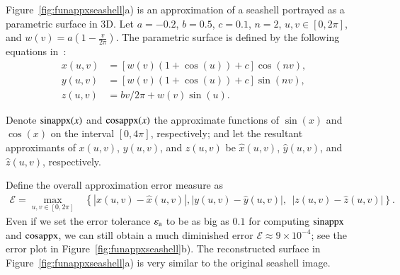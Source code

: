 \begin{exmp}
 
Figure~\ref{fig:funappxseashell}a) is an approximation of a 
seashell portrayed as a parametric surface in 3D. Let $a=-0.2$, $b=0.5$,
$c=0.1$, $n = 2$, $u,v \in [0, 2 \pi]$, and $w(v) =
a\left(1-\frac{v}{2\pi}\right)$. The parametric surface is defined by the
following equations in~\cite{DavEtal05}:
\begin{align*}
x(u,v) & =   \left[ w(v) \left(1+\cos(u)\right) + c\right]\cos(nv),\\
y(u,v) & = \left[w(v) (1+\cos(u)) + c\right] \sin(nv),\\
z(u,v) & = {bv}/{2\pi} + w(v)\sin(u).
\end{align*}
%

Denote $\operatorname*{sinappx}(x)$ and $\operatorname*{cosappx} (x)$ the approximate functions of $\sin(x)$ and
$\cos(x)$ on the interval $[0,4\pi]$, respectively; and let the resultant
approximants of $x(u,v)$, $y(u,v)$, and $z(u,v)$ be $\hat{x}(u,v)$,
$\hat{y}(u,v)$, and $\hat{z}(u,v)$, respectively.

Define the overall approximation error measure as
\begin{align*}
\mathscr{E} =  \max\limits_{u,v \in [0, 2 \pi] } & \left\{   |x(u,v)-\hat{x}(u,v)|,\right.
   \left.  |y(u,v)-\hat{y}(u,v)|, 
                                  \ \    |z(u,v)-\hat{z}(u,v)|\right\}.
\end{align*}
Even if we set the error tolerance $\varepsilon_{\textrm{a}}$ to be as big as $0.1$ for computing
$\operatorname*{sinappx}$ and $\operatorname*{cosappx}$, we can still obtain a much diminished error
$\mathscr{E}\approx 9 \times 10^{-4}$; see the error plot in
Figure~\ref{fig:funappxseashell}b). The reconstructed surface in
Figure~\ref{fig:funappxseashell}a) is very similar to the original seashell
image.

\end{exmp}

